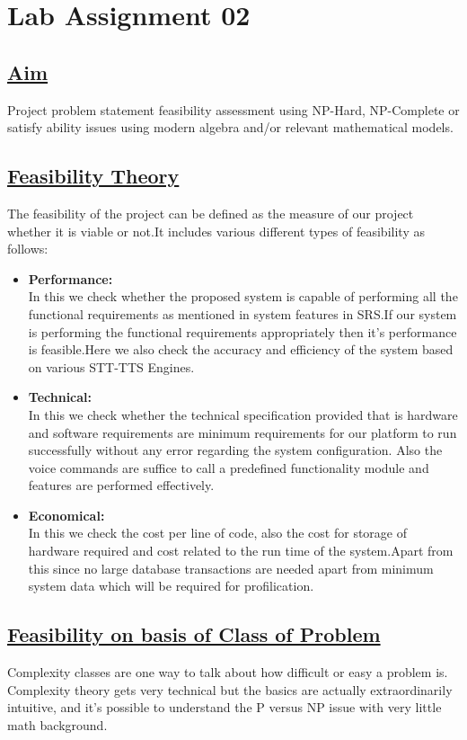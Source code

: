  
\newpage
\section*{\centering\LARGE{Lab Assignment 02}}
\subsection*{\underline{Aim}}
Project problem statement feasibility assessment using NP-Hard, NP-Complete or satisfy ability issues using modern algebra and/or relevant mathematical models.

\subsection*{\underline{Feasibility Theory}}
The feasibility of the project can be defined as the measure of our project whether it is viable or not.It includes various different types of feasibility as follows:
\begin{itemize}
\item \textbf{Performance:}\\
In this we check whether the proposed system is capable of performing all the functional requirements as mentioned in system features in SRS.If our system is performing the functional requirements appropriately then it's performance is feasible.Here we also check the accuracy and efficiency of the system based on various STT-TTS Engines.
\item \textbf{Technical:}\\
In this we check whether the technical specification provided that is hardware and software requirements are minimum requirements for our platform to run successfully without any error regarding the system configuration. Also the voice commands are suffice to call a predefined functionality module and features are performed effectively.
\item \textbf{Economical:}\\
In this we check the cost per line of code, also the cost for storage of hardware required and cost related to the run time of the system.Apart from this since no large database transactions are needed apart from minimum system data which will be required for profilication.

\end{itemize}
\noindent
\subsection*{\underline{Feasibility on basis of Class of Problem}}
\hspace{5em}Complexity classes are one way to talk about how difficult or easy a problem is.
Complexity theory gets very technical but the basics are actually extraordinarily
intuitive, and it's possible to understand the P versus NP issue with very little
math background.\\

